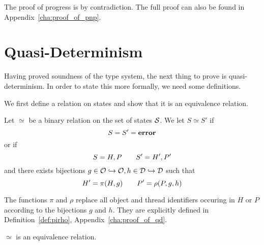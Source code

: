 The proof of progress is by contradiction. The full proof can also be found in
Appendix~\ref{cha:proof_of_pnp}.

\section{Quasi-Determinism}%
\label{sec:quasi_determinism}

Having proved soundness of the type system, the next thing to prove is
quasi-determinism. In order to state this more formally, we need some
definitions.

We first define a relation on states and show that it is an equivalence
relation.
\begin{definition} \label{def:eqrel}
  Let $\simeq$ be a binary relation on the set of states $\mathcal{S}$.
  We let $S \simeq S'$ if
  \begin{equation*}
    S = S' = \mbox{{\bf error}}
  \end{equation*}
  or if
  \begin{equation}
    S = H, P \quad\quad S' = H', P'
  \end{equation}
  and there exists bijections $g \in \mathcal{O} \hookrightarrow \mathcal{O}, h \in \mathcal{D}
  \hookrightarrow \mathcal{D}$ such that
  \begin{equation}
    H' = \pi(H, g) \quad\quad P' = \rho(P, g, h)
  \end{equation}
  
  The functions $\pi$ and $\rho$ replace all object and thread identifiers
  occuring in $H$ or $P$ according to the bijections $g$ and $h$. They are
  explicitly defined in Definition~\ref{def:pirho},
  Appendix~\ref{cha:proof_of_qd}.
\end{definition}



\begin{proposition} \label{prop:eqrel}
  $\simeq$ is an equivalence relation.
\end{proposition}

